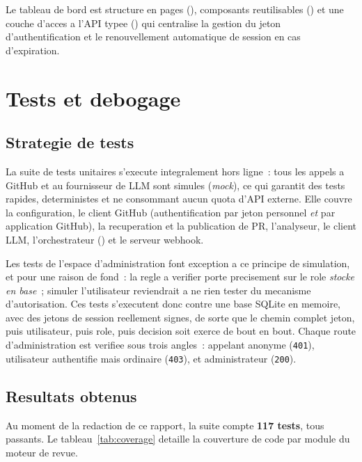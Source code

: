 \documentclass[a4paper,12pt,oneside]{report}
\begin{document}
Le tableau de bord est structure en pages (), composants reutilisables () et une couche d'acces a l'API typee () qui centralise la gestion du jeton d'authentification et le renouvellement automatique de session en cas d'expiration.

\section{Tests et debogage}

\subsection{Strategie de tests}

La suite de tests unitaires s'execute integralement hors ligne~: tous les appels a GitHub et au fournisseur de LLM sont simules (\emph{mock}), ce qui garantit des tests rapides, deterministes et ne consommant aucun quota d'API externe. Elle couvre la configuration, le client GitHub (authentification par jeton personnel \emph{et} par application GitHub), la recuperation et la publication de PR, l'analyseur, le client LLM, l'orchestrateur () et le serveur webhook.

Les tests de l'espace d'administration font exception a ce principe de simulation, et pour une raison de fond~: la regle a verifier porte precisement sur le role \emph{stocke en base}~; simuler l'utilisateur reviendrait a ne rien tester du mecanisme d'autorisation. Ces tests s'executent donc contre une base SQLite en memoire, avec des jetons de session reellement signes, de sorte que le chemin complet \og jeton, puis utilisateur, puis role, puis decision \fg{} soit exerce de bout en bout. Chaque route d'administration est verifiee sous trois angles~: appelant anonyme (\texttt{401}), utilisateur authentifie mais ordinaire (\texttt{403}), et administrateur (\texttt{200}).

\subsection{Resultats obtenus}

Au moment de la redaction de ce rapport, la suite compte \textbf{117 tests}, tous passants. Le tableau~\ref{tab:coverage} detaille la couverture de code par module du moteur de revue.
\end{document}
